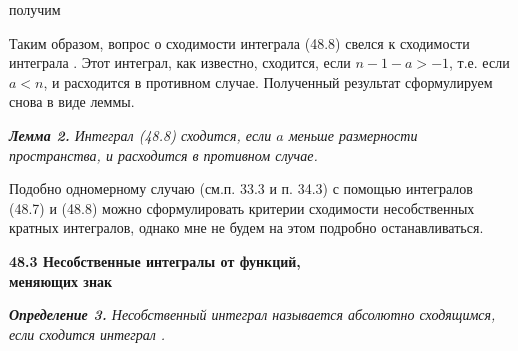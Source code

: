 ﻿\documentclass[12pt]{book}
\begin{document}
получим


Таким образом, вопрос о сходимости интеграла (48.8) свелся к сходимости интеграла %
. Этот интеграл, как известно, сходится, если $n - 1 - a > -1$, т.е. если $a < n$, и расходится в противном случае. Полученный результат сформулируем снова в виде леммы.

\slshape{{\bfseries{Лемма 2.}} Интеграл (48.8) сходится, если $a$
меньше размерности пространства, и расходится в противном случае.}

Подобно одномерному случаю (см.п. 33.3 и п. 34.3) с помощью интегралов (48.7) и (48.8) можно сформулировать 
критерии сходимости несобственных кратных интегралов, однако мне не будем на этом подробно останавливаться.

\begin{center}
\bfseries {48.3 Несобственные интегралы от функций,\\ меняющих знак}
\end{center}

\slshape{{\bfseries{Определение 3.}} Несобственный интеграл %
называется абсолютно сходящимся, если сходится интеграл %
.}
\end{document}

